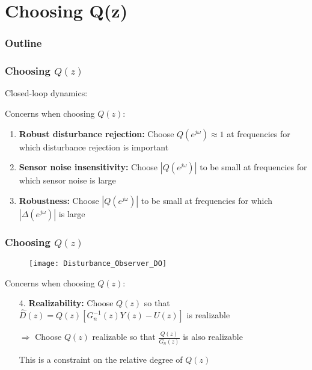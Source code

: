 \section{Choosing Q(z)}
\begin{frame}
    \frametitle{Outline}
    \tableofcontents[currentsection]
\end{frame}

\begin{frame}
    \frametitle{Choosing $Q(z)$}
    Closed-loop dynamics:

    Concerns when choosing $Q(z)$:
    \begin{enumerate}
    \item \textbf{Robust disturbance rejection:}
    Choose $Q(e^{j\omega}) \approx 1$ at frequencies for which disturbance rejection is important
    \pause

    \item \textbf{Sensor noise insensitivity:}
    Choose $|Q(e^{j\omega})|$ to be small at frequencies for which sensor noise is large
    \pause

    \item \textbf{Robustness:}
    Choose $|Q(e^{j\omega})|$ to be small at frequencies for which $|\Delta(e^{j\omega})|$ is large
    \end{enumerate}
\end{frame}

\begin{frame}
    \frametitle{Choosing $Q(z)$}

    \begin{figure}
        \texttt{[image: Disturbance\_Observer\_DO]}\\
    \end{figure}

    Concerns when choosing $Q(z)$:
    \begin{enumerate}
    \item[4.] \textbf{Realizability:}
    Choose $Q(z)$ so that $\hat{D}(z) = Q(z) [ G_n^{-1}(z) Y(z) - U(z)]$ is realizable
    \pause
    \newline

    $\Rightarrow$ Choose $Q(z)$ realizable so that $\displaystyle\frac{Q(z)}{G_n(z)}$ is also realizable
    \pause
    \newline

    This is a constraint on the relative degree of $Q(z)$

    \end{enumerate}
\end{frame} 